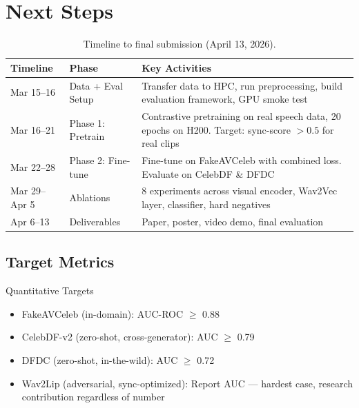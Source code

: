 \documentclass[12pt, letterpaper]{article}
\begin{document}
\section{Next Steps}

\renewcommand{\arraystretch}{1.6}
\begin{table}[H]
\centering
\begin{tabularx}{\textwidth}{@{} p{2.5cm} p{3cm} X @{}}
\toprule
\textbf{Timeline} & \textbf{Phase} & \textbf{Key Activities} \\
\midrule
Mar 15--16 & Data + Eval Setup & Transfer data to HPC, run preprocessing, build evaluation framework, GPU smoke test \\
Mar 16--21 & Phase 1: Pretrain & Contrastive pretraining on real speech data, 20 epochs on H200. Target: sync-score $> 0.5$ for real clips \\
Mar 22--28 & Phase 2: Fine-tune & Fine-tune on FakeAVCeleb with combined loss. Evaluate on CelebDF \& DFDC \\
Mar 29--Apr 5 & Ablations & 8 experiments across visual encoder, Wav2Vec layer, classifier, hard negatives \\
Apr 6--13 & Deliverables & Paper, poster, video demo, final evaluation \\
\bottomrule
\end{tabularx}
\caption{Timeline to final submission (April 13, 2026).}
\end{table}
\renewcommand{\arraystretch}{1.0}

\subsection{Target Metrics}

\begin{resultbox}{Quantitative Targets}
\begin{itemize}[leftmargin=1.5em, topsep=0pt]
    \item FakeAVCeleb (in-domain): AUC-ROC $\geq$ 0.88
    \item CelebDF-v2 (zero-shot, cross-generator): AUC $\geq$ 0.79
    \item DFDC (zero-shot, in-the-wild): AUC $\geq$ 0.72
    \item Wav2Lip (adversarial, sync-optimized): Report AUC — hardest case, research contribution regardless of number
\end{itemize}
\end{resultbox}
\end{document}
